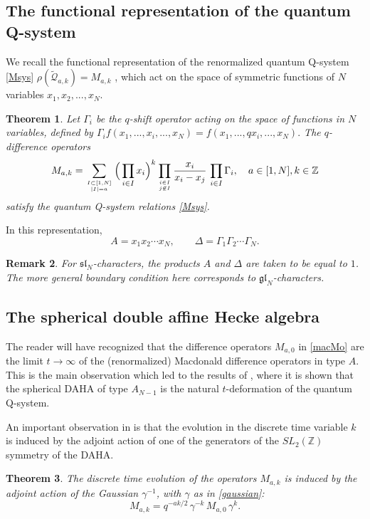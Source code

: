 \documentclass[12pt]{amsart}
\newtheorem{thm}{Theorem}[section]
\newtheorem{remark}[thm]{Remark}
\newcommand{\gl}{{\mathfrak{gl}}}
\renewcommand{\sl}{{\mathfrak{sl}}}
\newcommand{\Z}{{\mathbb Z}}
\newcommand{\Q}{{\mathcal Q}}
\numberwithin{equation}{section}
\numberwithin{table}{section}
\begin{document}
\subsection{The functional representation of the quantum Q-system}
We recall the functional representation of the renormalized quantum Q-system \eqref{Msys} $\rho (\widetilde\Q_{a,k})=M_{a,k}$ \cite{DFK15}, which act
on the space of symmetric functions of $N$ variables $x_1,x_2,...,x_N$.
\begin{thm}\cite{DFK15,DFK16}\label{macdoQsys}
Let $\Gamma_i$ be the $q$-shift operator acting on the space of functions in $N$ variables, defined by
$\Gamma_i f(x_1,...,x_i,...,x_N) = f(x_1,...,q x_i, ..., x_N).$ The $q$-difference operators
\begin{equation}\label{macMo} 
M_{a,k}=\sum_{I\subset [1,N]\atop |I|=a} \Big(\prod_{i\in I}x_i\Big)^k
\prod_{i\in I\atop j\not\in I} \frac{x_i}{x_i-x_j}\, \prod_{i\in I} \Gamma_i ,\quad a\in[1,N], k\in\Z
\end{equation}
satisfy the quantum Q-system relations \eqref{Msys}.
\end{thm}
In this representation,
\begin{equation}
A=x_1x_2\cdots x_N,\qquad \Delta=\Gamma_1\Gamma_2\cdots \Gamma_N .
\end{equation}
\begin{remark}\label{glvssl} For $\sl_N$-characters, the products $A$ and $\Delta$ are taken to be equal to $1$. The more general boundary condition here corresponds to $\gl_N$-characters.
\end{remark}




\subsection{The spherical double affine Hecke algebra}
The reader will have recognized that the difference operators $M_{a,0}$ in  \eqref{macMo} are the 
limit $t\to \infty$  of the (renormalized) Macdonald difference operators in type $A$. This is the main observation which led to the results of \cite{DFKqt}, where it is shown that the spherical DAHA \cite{Cheredbook} of type $A_{N-1}$
is the natural $t$-deformation of the quantum Q-system. 

An important observation in \cite{DFKqt} is that the evolution in the discrete time variable $k$ is induced by the adjoint action of one of
the generators of the $SL_2(\Z)$ symmetry of the DAHA.
\begin{thm}{\cite{DFKqt}}\label{gauM}
The discrete time evolution of the operators $M_{a,k}$ is induced by the adjoint action of the Gaussian $\gamma^{-1}$,
with $\gamma$ as in 
\eqref{gaussian}:
\begin{equation}\label{adjA}
M_{a,k}=q^{-a k/2}\, \gamma^{-k}\, M_{a,0}\, \gamma^k .
\end{equation}
\end{thm}
\end{document}
